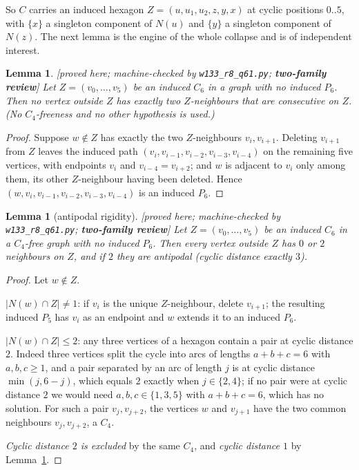 \documentclass[11pt]{article}
\theoremstyle{plain}
\newtheorem{lemma}[theorem]{Lemma}
\theoremstyle{definition}
\theoremstyle{remark}
\numberwithin{equation}{section}
\newcommand{\statusbox}[1]{{\small\sloppy\textsf{[#1]}}}
\newcommand{\REV}[1]{\statusbox{proved here; machine-checked by \texttt{#1};
\textbf{two-family review}}}
\begin{document}
So $C$ carries an induced hexagon $Z = (u, u_1, u_2, z, y, x)$ at cyclic positions $0..5$,
with $\{x\}$ a singleton component of $N(u)$ and $\{y\}$ a singleton component of $N(z)$.
The next lemma is the engine of the whole collapse and is of independent interest.

\begin{lemma}\label{lem:g32p}
\REV{w133\_r8\_q61.py}
Let $Z = (v_0,\dots,v_5)$ be an induced $C_6$ in a graph with no induced $P_6$. Then no
vertex outside $Z$ has exactly two $Z$-neighbours that are \emph{consecutive} on $Z$. (No
$C_4$-freeness and no other hypothesis is used.)
\end{lemma}

\begin{proof}
Suppose $w \notin Z$ has exactly the two $Z$-neighbours $v_i, v_{i+1}$. Deleting $v_{i+1}$
from $Z$ leaves the induced path $(v_i, v_{i-1}, v_{i-2}, v_{i-3}, v_{i-4})$ on the remaining
five vertices, with endpoints $v_i$ and $v_{i-4} = v_{i+2}$; and $w$ is adjacent to $v_i$
only among them, its other $Z$-neighbour having been deleted. Hence
$(w, v_i, v_{i-1}, v_{i-2}, v_{i-3}, v_{i-4})$ is an induced $P_6$.
\end{proof}

\begin{lemma}[antipodal rigidity]\label{lem:g32}
\REV{w133\_r8\_q61.py}
Let $Z = (v_0,\dots,v_5)$ be an induced $C_6$ in a $C_4$-free graph with no induced $P_6$.
Then every vertex outside $Z$ has $0$ or $2$ neighbours on $Z$, and if $2$ they are
\emph{antipodal} (cyclic distance exactly $3$).
\end{lemma}

\begin{proof}
Let $w \notin Z$.

\emph{$|N(w)\cap Z| \ne 1$}: if $v_i$ is the unique $Z$-neighbour, delete $v_{i+1}$; the
resulting induced $P_5$ has $v_i$ as an endpoint and $w$ extends it to an induced $P_6$.

\emph{$|N(w)\cap Z| \le 2$}: any three vertices of a hexagon contain a pair at cyclic
distance $2$. Indeed three vertices split the cycle into arcs of lengths $a+b+c = 6$ with
$a,b,c \ge 1$, and a pair separated by an arc of length $j$ is at cyclic distance
$\min(j,6-j)$, which equals $2$ exactly when $j \in \{2,4\}$; if no pair were at cyclic
distance $2$ we would need $a,b,c \in \{1,3,5\}$ with $a+b+c = 6$, which has no solution.
For such a pair $v_j, v_{j+2}$, the vertices $w$ and $v_{j+1}$ have the two common
neighbours $v_j, v_{j+2}$, a $C_4$.

\emph{Cyclic distance $2$ is excluded} by the same $C_4$, and \emph{cyclic distance $1$} by
Lemma~\ref{lem:g32p}.
\end{proof}
\end{document}
